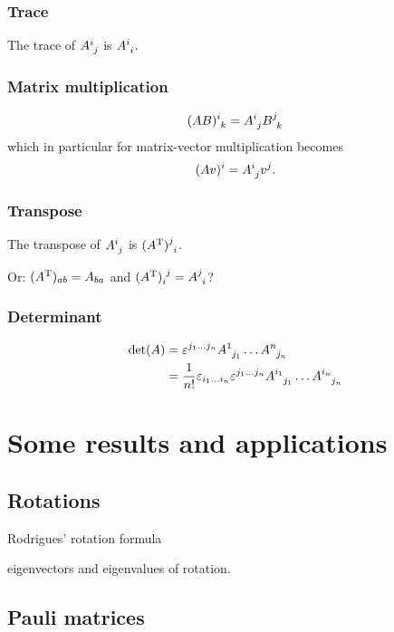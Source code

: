 \subsection{Trace}
The trace of $\tensor{A}{^i_j}$ is $\tensor{A}{^i_i}$.
\subsection{Matrix multiplication}
\[ \tensor{(AB)}{^{i}_{k}}=\tensor{A}{^{i}_{j}}\tensor{B}{^{j}_{k}} \]
which in particular for matrix-vector multiplication becomes
\[ (Av)^i = \tensor{A}{^i_j} v^j. \]
\subsection{Transpose}
The transpose of $\tensor{A}{^i_j}$ is $\tensor{(A^\transp)}{^j_i}$.

Or: $(A^{\mathrm{T}})_{ab} = A_{ba}$ and $\tensor{(A^\transp)}{_i^j} = \tensor{A}{^j_i}$?
\subsection{Determinant}
\begin{align*}
\det(A) &= \varepsilon^{j_1\ldots j_n}\tensor{A}{^{1}_{j_1}}\ldots \tensor{A}{^{n}_{j_n}} \\
&= \frac{1}{n!}\varepsilon_{i_1\ldots i_n}\varepsilon^{j_1\ldots j_n}\tensor{A}{^{i_1}_{j_1}}\ldots \tensor{A}{^{i_n}_{j_n}}
\end{align*}


\chapter{Some results and applications}
\section{Rotations}
Rodrigues' rotation formula

eigenvectors and eigenvalues of rotation.
\section{Pauli matrices}

